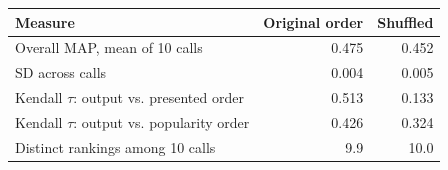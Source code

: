 \begin{tabular}{lrr}
\toprule
Measure & Original order & Shuffled \\
\midrule
Overall MAP, mean of 10 calls & 0.475 & 0.452 \\
SD across calls & 0.004 & 0.005 \\
Kendall $\tau$: output vs. presented order & 0.513 & 0.133 \\
Kendall $\tau$: output vs. popularity order & 0.426 & 0.324 \\
Distinct rankings among 10 calls & 9.9 & 10.0 \\
\bottomrule
\end{tabular}
